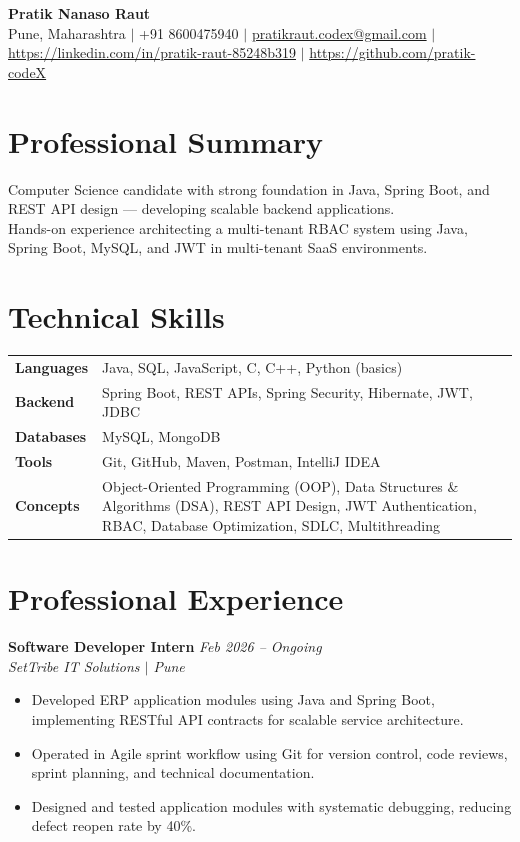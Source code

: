 \documentclass[10.5pt,a4paper]{article}
\begin{document}
\begin{center}
{\Large\bfseries Pratik Nanaso Raut}\\[2pt]
Pune, Maharashtra $|$ +91 8600475940 $|$ \href{mailto:pratikraut.codex@gmail.com}{pratikraut.codex@gmail.com} $|$ \href{https://linkedin.com/in/pratik-raut-85248b319}{https://linkedin.com/in/pratik-raut-85248b319} $|$ \href{https://github.com/pratik-codeX}{https://github.com/pratik-codeX}
\end{center}
\vspace{-2pt}
\section{Professional Summary}
Computer Science candidate with strong foundation in Java, Spring Boot, and REST API design — developing scalable backend applications.\\[2pt]
Hands-on experience architecting a multi-tenant RBAC system using Java, Spring Boot, MySQL, and JWT in multi-tenant SaaS environments.
\section{Technical Skills}
\begin{tabular}{@{}p{}p{}@{}}
\textbf{Languages} & Java, SQL, JavaScript, C, C++, Python (basics) \\[1pt]
\textbf{Backend} & Spring Boot, REST APIs, Spring Security, Hibernate, JWT, JDBC \\[1pt]
\textbf{Databases} & MySQL, MongoDB \\[1pt]
\textbf{Tools} & Git, GitHub, Maven, Postman, IntelliJ IDEA \\[1pt]
\textbf{Concepts} & Object-Oriented Programming (OOP), Data Structures \& Algorithms (DSA), REST API Design, JWT Authentication, RBAC, Database Optimization, SDLC, Multithreading \\
\end{tabular}
\section{Professional Experience}
\textbf{Software Developer Intern} \hfill \textit{Feb 2026 -- Ongoing}
\\\textit{SetTribe IT Solutions $|$ Pune}
\begin{itemize}
  \item Developed ERP application modules using Java and Spring Boot, implementing RESTful API contracts for scalable service architecture.
  \item Operated in Agile sprint workflow using Git for version control, code reviews, sprint planning, and technical documentation.
  \item Designed and tested application modules with systematic debugging, reducing defect reopen rate by 40\%.
\end{itemize}
\end{document}
